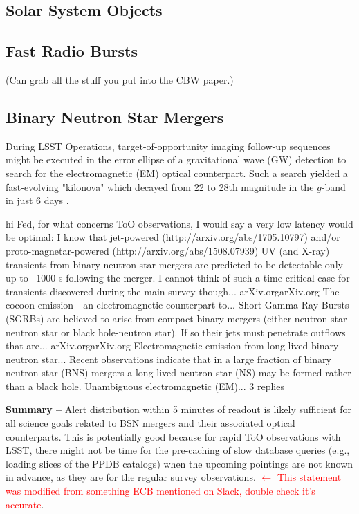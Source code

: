 \documentclass[DM,lsstdraft,authoryear,toc]{lsstdoc}
\begin{document}
\subsection{Solar System Objects}



\subsection{Fast Radio Bursts}

(Can grab all the stuff you put into the CBW paper.)


\subsection{Binary Neutron Star Mergers}

During LSST Operations, target-of-opportunity imaging follow-up sequences might be executed in the error ellipse of a gravitational wave (GW) detection to search for the electromagnetic (EM) optical counterpart. Such a search yielded a fast-evolving "kilonova" which decayed from 22 to 28th magnitude in the $g$-band in just 6 days \citep[faster in the bluer and slower in the redder filters][]{2017Sci...358.1559K}. 



hi Fed, for what concerns ToO observations, I would say a very low latency would be optimal: I know that jet-powered (http://arxiv.org/abs/1705.10797) and/or proto-magnetar-powered (http://arxiv.org/abs/1508.07939) UV (and X-ray) transients from binary neutron star mergers are predicted to be detectable only up to ~1000 s following the merger. I cannot think of such a time-critical case for transients discovered during the main survey though...
arXiv.orgarXiv.org
The cocoon emission - an electromagnetic counterpart to...
Short Gamma-Ray Bursts (SGRBs) are believed to arise from compact binary mergers (either neutron star-neutron star or black hole-neutron star). If so their jets must penetrate outflows that are...
arXiv.orgarXiv.org
Electromagnetic emission from long-lived binary neutron star...
Recent observations indicate that in a large fraction of binary neutron star (BNS) mergers a long-lived neutron star (NS) may be formed rather than a black hole. Unambiguous electromagnetic (EM)...
3 replies


{\bf Summary --} Alert distribution within 5 minutes of readout is likely sufficient for all science goals related to BSN mergers and their associated optical counterparts. This is potentially good because for rapid ToO observations with LSST, there might not be time for the pre-caching of slow database queries (e.g., loading slices of the PPDB catalogs) when the upcoming pointings are not known in advance, as they are for the regular survey observations. \textcolor{red}{$\leftarrow$ This statement was modified from something ECB mentioned on Slack, double check it's accurate}.
\end{document}
